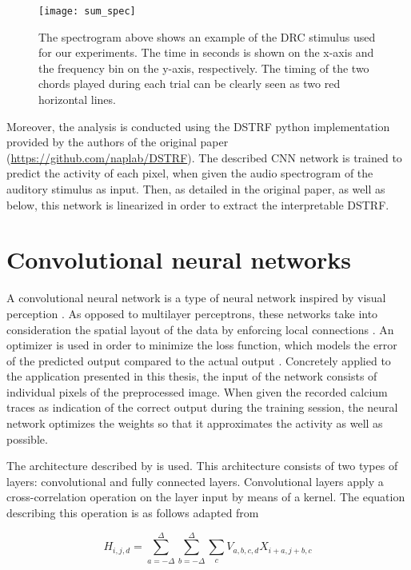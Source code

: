 \begin{figure}[ht]
\centering
	\texttt{[image: sum\_spec]}
\caption{The spectrogram above shows an example of the DRC stimulus used for our experiments. The time in seconds is shown on the x-axis and the frequency bin on the y-axis, respectively. The timing of the two chords played during each trial can be clearly seen as two red horizontal lines.}
\label{fig:spec}
\end{figure}

Moreover, the analysis is conducted using the DSTRF python implementation provided by the authors of the original paper (\href{https://github.com/naplab/DSTRF}{https://github.com/naplab/DSTRF}). The described CNN network is trained to predict the activity of each pixel, when given the audio spectrogram of the auditory stimulus as input. Then, as detailed in the original paper, as well as below, this network is linearized in order to extract the interpretable DSTRF.

\section{Convolutional neural networks}

A convolutional neural network is a type of neural network inspired by visual perception \parencite{liSurveyConvolutionalNeural2022}. As opposed to multilayer perceptrons, these networks take into consideration the spatial layout of the data by enforcing local connections \parencite{zhangDiveDeepLearning2024}. An optimizer is used in order to minimize the loss function, which models the error of the predicted output compared to the actual output \parencite{liSurveyConvolutionalNeural2022}. Concretely applied to the application presented in this thesis, the input of the network consists of individual pixels of the preprocessed image. When given the recorded calcium traces as indication of the correct output during the training session, the neural network optimizes the weights so that it approximates the activity as well as possible. 
	
The architecture described by \textcite{keshishianEstimatingInterpretingNonlinear2020} is used. This architecture consists of two types of layers: convolutional and fully connected layers. Convolutional layers apply a cross-correlation operation on the layer input by means of a kernel. The equation describing this operation is as follows adapted from \textcite{zhangDiveDeepLearning2024}\:

\begin{equation*}
	H_{i, j, d} = \sum_{a=-\Delta}^\Delta \sum_{b=-\Delta}^\Delta \sum_c V_{a, b, c ,d} X_{i+a, j+b, c}
\end{equation*}

